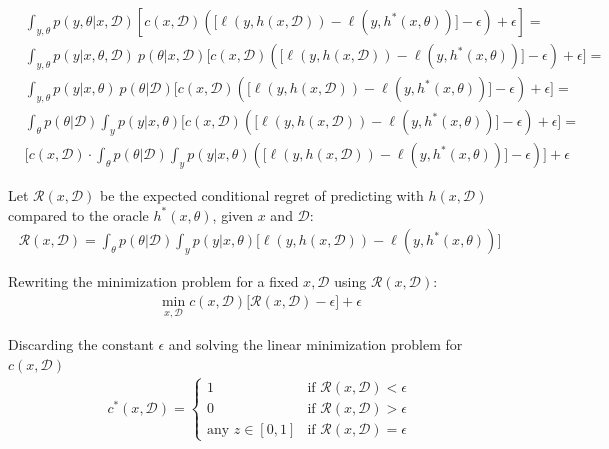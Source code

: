 \begin{align}
&\int_{y,\theta} p(y,\theta|x,\mathcal{D}) \left[ c(x,\mathcal{D})\left(\big[\ell(y,h(x,\mathcal{D})) - \ell(y,h^*(x,\theta))\big] - \epsilon\right) + \epsilon \right] \nonumber = \\
&\int_{y, \theta} p(y|x,\theta,\mathcal{D})\ p(\theta| x,\mathcal{D}) \Bigg[ c(x,\mathcal{D})\left(\big[\ell(y,h(x,\mathcal{D})) - \ell(y,h^*(x,\theta))\big] - \epsilon\right) + \epsilon \Bigg] = \nonumber \\
&\int_{y, \theta} p(y|x,\theta)\ p(\theta| \mathcal{D}) \Bigg[ c(x,\mathcal{D})\left(\big[\ell(y,h(x,\mathcal{D})) - \ell(y,h^*(x,\theta))\big] - \epsilon\right) + \epsilon \Bigg] = \nonumber \\
&\int_{\theta} p(\theta|\mathcal{D}) \int_{y} p(y|x,\theta) \Bigg[ c(x,\mathcal{D})\left(\big[\ell(y,h(x,\mathcal{D})) - \ell(y,h^*(x,\theta))\big] - \epsilon\right) + \epsilon \Bigg] = \nonumber \\
& \Bigg[c(x,\mathcal{D}) \cdot \int_{\theta} p(\theta|\mathcal{D}) \int_{y} p(y|x,\theta) \left(\big[\ell(y,h(x,\mathcal{D})) - \ell(y,h^*(x,\theta))\big] - \epsilon\right)\Bigg] + \epsilon
\end{align}

Let $\mathcal{R}(x, \mathcal{D})$ be the expected conditional regret of predicting with $h(x,\mathcal{D})$ compared to the oracle $h^*(x,\theta)$, given $x$ and $\mathcal{D}$:
\begin{align}
\mathcal{R}(x, \mathcal{D}) = \int_{\theta} p(\theta|\mathcal{D}) \int_{y} p(y|x,\theta) \Big[\ell(y,h(x,\mathcal{D})) - \ell(y,h^*(x,\theta))\Big]
\end{align}

Rewriting the minimization problem for a fixed $x, \mathcal{D}$ using $\mathcal{R}(x, \mathcal{D})$:
\begin{align}
\min_{x,\mathcal{D}} c(x,\mathcal{D}) \big[ \mathcal{R}(x, \mathcal{D}) - \epsilon \big] + \epsilon
\end{align}

Discarding the constant $\epsilon$ and solving the linear minimization problem for $c(x, \mathcal{D})$
\begin{align}
c^*(x,\mathcal{D}) = \begin{cases}
    1 & \text{if } \mathcal{R}(x, \mathcal{D}) < \epsilon\\
    0 & \text{if } \mathcal{R}(x, \mathcal{D}) > \epsilon\\
    \text{any }z\in[0,1] & \text{if } \mathcal{R}(x, \mathcal{D}) = \epsilon
\end{cases}    
\end{align}


